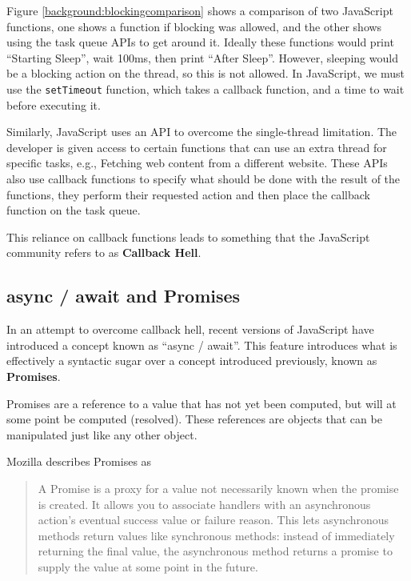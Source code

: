 Figure \ref{background:blockingcomparison} shows a comparison of two JavaScript functions, one shows a function if blocking was allowed, and the other shows using the task queue APIs to get around it. Ideally these functions would print ``Starting Sleep'', wait 100ms, then print ``After Sleep''. However, sleeping would be a blocking action on the thread, so this is not allowed. In JavaScript, we must use the \texttt{setTimeout} function, which takes a callback function, and a time to wait before executing it.

Similarly, JavaScript uses an API to overcome the single-thread limitation. The developer is given access to certain functions that can use an extra thread for specific tasks, e.g., Fetching web content from a different website. These APIs also use callback functions to specify what should be done with the result of the functions, they perform their requested action and then place the callback function on the task queue.

This reliance on callback functions leads to something that the JavaScript community refers to as \textbf{Callback Hell}\cite{callbackhell}.

\subsection{async / await and Promises}\label{background:asyncawait}

In an attempt to overcome callback hell, recent versions of JavaScript have introduced a concept known as ``async / await''.\cite{es8spec} This feature introduces what is effectively a syntactic sugar over a concept introduced previously, known as \textbf{Promises}.

Promises are a reference to a value that has not yet been computed, but will at some point be computed (resolved). These references are objects that can be manipulated just like any other object.

Mozilla describes Promises as
\begin{quote}
A Promise is a proxy for a value not necessarily known when the promise is created. It allows you to associate handlers with an asynchronous action's eventual success value or failure reason. This lets asynchronous methods return values like synchronous methods: instead of immediately returning the final value, the asynchronous method returns a promise to supply the value at some point in the future.
    \cite{mozillapromises}
\end{quote}

